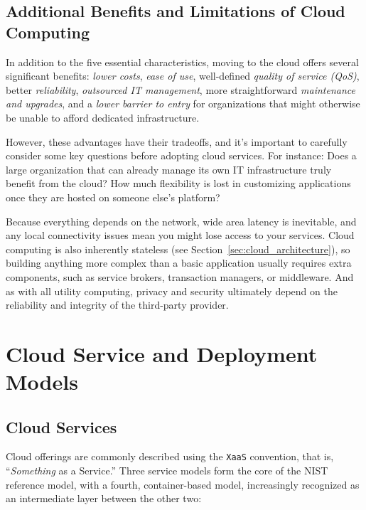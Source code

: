 \subsection{Additional Benefits and Limitations of Cloud Computing}

In addition to the five essential characteristics, moving to the cloud offers several significant benefits: \textit{lower costs}, \textit{ease of use}, well-defined \textit{quality of service (QoS)}, better \textit{reliability}, \textit{outsourced IT management}, more straightforward \textit{maintenance and upgrades}, and a \textit{lower barrier to entry} for organizations that might otherwise be unable to afford dedicated infrastructure.

\smallskip

However, these advantages have their tradeoffs, and it's important to carefully consider some key questions before adopting cloud services. For instance: Does a large organization that can already manage its own IT infrastructure truly benefit from the cloud? How much flexibility is lost in customizing applications once they are hosted on someone else's platform?

\smallskip

Because everything depends on the network, wide area latency is inevitable, and any local connectivity issues mean you might lose access to your services. Cloud computing is also inherently stateless (see Section~\ref{sec:cloud_architecture}), so building anything more complex than a basic application usually requires extra components, such as service brokers, transaction managers, or middleware. And as with all utility computing, privacy and security ultimately depend on the reliability and integrity of the third-party provider.

\section{Cloud Service and Deployment Models} \label{sec:service_deployment_models}

\subsection{Cloud Services}

Cloud offerings are commonly described using the \texttt{XaaS} convention, that is, ``\textit{Something} as a Service.'' Three service models form the core of the NIST reference model, with a fourth, container-based model, increasingly recognized as an intermediate layer between the other two:

